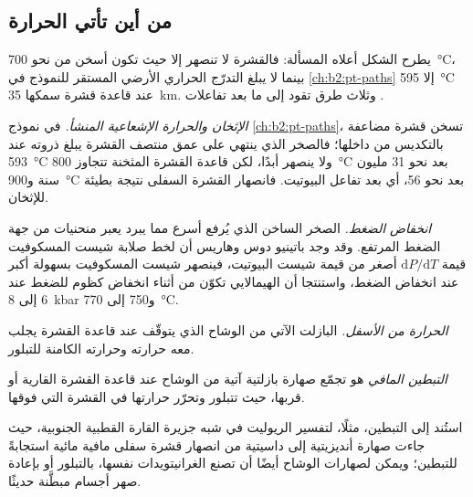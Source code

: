 \subsection*{من أين تأتي الحرارة}

يطرح الشكل أعلاه المسألة: فالقشرة لا تنصهر إلا حيث تكون أسخن من نحو
\qty{700}{\celsius}، بينما لا يبلغ التدرّج الحراري الأرضي المستقر للنموذج في \cref{ch:b2:pt-paths}
إلا \qty{595}{\celsius} عند قاعدة قشرة سمكها \qty{35}{km}. وثلاث طرق تقود
إلى ما بعد تفاعلات .

\emph{الإثخان والحرارة الإشعاعية المنشأ.} في نموذج \cref{ch:b2:pt-paths}، تسخن قشرة
مضاعفة بالتكديس من داخلها؛ فالصخر الذي ينتهي على عمق منتصف القشرة يبلغ ذروته عند
\qty{593}{\celsius} ولا ينصهر أبدًا، لكن قاعدة القشرة المثخنة تتجاوز
\qty{800}{\celsius} بعد نحو 31 مليون سنة و\qty{900}{\celsius} بعد نحو 56، أي بعد
تفاعل البيوتيت. فانصهار القشرة السفلى نتيجة بطيئة للإثخان.

\emph{انخفاض الضغط.} الصخر الساخن الذي يُرفع أسرع مما يبرد يعبر
منحنيات  من جهة الضغط المرتفع. وقد وجد باتينيو دوس وهاريس أن
لخط صلابة شيست المسكوفيت قيمة $\mathrm{d}P/\mathrm{d}T$ أصغر من قيمة
شيست البيوتيت، فينصهر شيست المسكوفيت بسهولة أكبر عند انخفاض الضغط،
واستنتجا أن  الهيمالايي تكوّن  من 
أثناء انخفاض كظوم للضغط عند 6 إلى \qty{8}{kbar} و750 إلى \qty{770}{\celsius}.

\emph{الحرارة من الأسفل.} البازلت الآتي من الوشاح الذي يتوقّف عند قاعدة القشرة يجلب
معه حرارته وحرارته الكامنة للتبلور.

\begin{definition}\label{def:b2:crustal-melting:underplating}
\emph{التبطين المافي} هو تجمّع صهارة بازلتية
آتية من الوشاح عند قاعدة القشرة القارية أو قربها، حيث تتبلور
وتحرّر حرارتها في القشرة التي فوقها.
\end{definition}

استُند إلى التبطين، مثلًا، لتفسير الريوليت في شبه جزيرة القارة القطبية الجنوبية،
حيث جاءت صهارة أنديزيتية إلى داسيتية من انصهار قشرة سفلى مافية مائية
استجابةً للتبطين؛ ويمكن لصهارات الوشاح أيضًا أن تصنع الغرانيتويدات نفسها، بالتبلور
أو بإعادة صهر أجسام مبطَّنة حديثًا.

